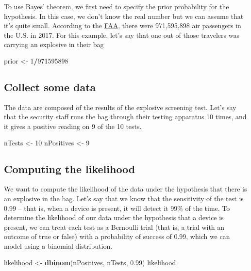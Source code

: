 \documentclass[]{book}
\newenvironment{Shaded}{\begin{snugshade}}{\end{snugshade}}
\newcommand{\KeywordTok}[1]{\textcolor[rgb]{0.13,0.29,0.53}{\textbf{#1}}}
\newcommand{\DecValTok}[1]{\textcolor[rgb]{0.00,0.00,0.81}{#1}}
\newcommand{\FloatTok}[1]{\textcolor[rgb]{0.00,0.00,0.81}{#1}}
\newcommand{\StringTok}[1]{\textcolor[rgb]{0.31,0.60,0.02}{#1}}
\newcommand{\OperatorTok}[1]{\textcolor[rgb]{0.81,0.36,0.00}{\textbf{#1}}}
\newcommand{\NormalTok}[1]{#1}
\theoremstyle{definition}
\theoremstyle{definition}
\theoremstyle{definition}
\theoremstyle{remark}
\begin{document}
To use Bayes' theorem, we first need to specify the prior probability
for the hypothesis. In this case, we don't know the real number but we
can assume that it's quite small. According to the
\href{https://www.faa.gov/air_traffic/by_the_numbers/media/Air_Traffic_by_the_Numbers_2018.pdf}{FAA},
there were 971,595,898 air passengers in the U.S. in 2017. For this
example, let's say that one out of those travelers was carrying an
explosive in their bag

\begin{Shaded}
\begin{Highlighting}[]
\NormalTok{prior <-}\StringTok{ }\DecValTok{1}\OperatorTok{/}\DecValTok{971595898}
\end{Highlighting}
\end{Shaded}

\subsection{Collect some data}\label{collect-some-data}

The data are composed of the results of the explosive screening test.
Let's say that the security staff runs the bag through their testing
apparatus 10 times, and it gives a positive reading on 9 of the 10
tests.

\begin{Shaded}
\begin{Highlighting}[]
\NormalTok{nTests <-}\StringTok{ }\DecValTok{10}
\NormalTok{nPositives <-}\StringTok{ }\DecValTok{9}
\end{Highlighting}
\end{Shaded}

\subsection{Computing the likelihood}\label{computing-the-likelihood}

We want to compute the likelihood of the data under the hypothesis that
there is an explosive in the bag. Let's say that we know that the
sensitivity of the test is 0.99 -- that is, when a device is present, it
will detect it 99\% of the time. To determine the likelihood of our data
under the hypothesis that a device is present, we can treat each test as
a Bernoulli trial (that is, a trial with an outcome of true or false)
with a probability of success of 0.99, which we can model using a
binomial distribution.

\begin{Shaded}
\begin{Highlighting}[]
\NormalTok{likelihood <-}\StringTok{ }\KeywordTok{dbinom}\NormalTok{(nPositives, nTests, }\FloatTok{0.99}\NormalTok{)}
\NormalTok{likelihood}
\end{Highlighting}
\end{Shaded}
\end{document}
